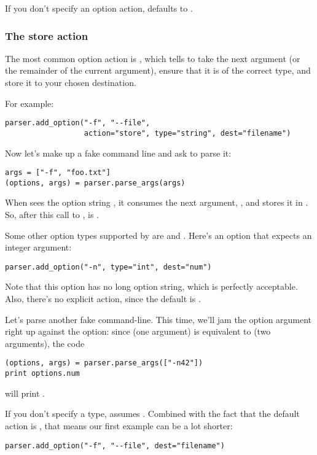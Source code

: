 If you don't specify an option action,  defaults to .


\subsubsection{The store action\label{optparse-store-action}}

The most common option action is , which tells  to take
the next argument (or the remainder of the current argument), ensure
that it is of the correct type, and store it to your chosen destination.

For example:
\begin{verbatim}
parser.add_option("-f", "--file",
                  action="store", type="string", dest="filename")
\end{verbatim}

Now let's make up a fake command line and ask  to parse it:
\begin{verbatim}
args = ["-f", "foo.txt"]
(options, args) = parser.parse_args(args)
\end{verbatim}

When  sees the option string , it consumes the next
argument, , and stores it in .  So,
after this call to ,  is
.

Some other option types supported by  are  and .
Here's an option that expects an integer argument:
\begin{verbatim}
parser.add_option("-n", type="int", dest="num")
\end{verbatim}

Note that this option has no long option string, which is perfectly
acceptable.  Also, there's no explicit action, since the default is
.

Let's parse another fake command-line.  This time, we'll jam the option
argument right up against the option: since  (one argument) is
equivalent to  (two arguments), the code
\begin{verbatim}
(options, args) = parser.parse_args(["-n42"])
print options.num
\end{verbatim}

will print .

If you don't specify a type,  assumes .  Combined with the
fact that the default action is , that means our first example
can be a lot shorter:
\begin{verbatim}
parser.add_option("-f", "--file", dest="filename")
\end{verbatim}

